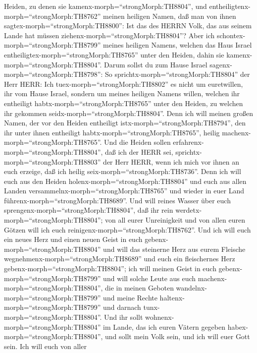 Heiden, zu denen sie kamenx-morph=``strongMorph:TH8804'', und
entheiligtenx-morph=``strongMorph:TH8762'' meinen heiligen Namen, daß
man von ihnen sagtex-morph=``strongMorph:TH8800'': Ist das des HERRN
Volk, das aus seinem Lande hat müssen
ziehenx-morph=``strongMorph:TH8804''?  Aber ich
schontex-morph=``strongMorph:TH8799'' meines heiligen Namens, welchen
das Haus Israel entheiligtex-morph=``strongMorph:TH8765'' unter den
Heiden, dahin sie kamenx-morph=``strongMorph:TH8804''. 
Darum sollst du zum Hause Israel sagenx-morph=``strongMorph:TH8798'': So
sprichtx-morph=``strongMorph:TH8804'' der Herr HERR: Ich
tuex-morph=``strongMorph:TH8802'' es nicht um euretwillen, ihr vom Hause
Israel, sondern um meines heiligen Namens willen, welchen ihr entheiligt
habtx-morph=``strongMorph:TH8765'' unter den Heiden, zu welchen ihr
gekommen seidx-morph=``strongMorph:TH8804''.  Denn ich will
meinen großen Namen, der vor den Heiden entheiligt
istx-morph=``strongMorph:TH8794'', den ihr unter ihnen entheiligt
habtx-morph=``strongMorph:TH8765'', heilig
machenx-morph=``strongMorph:TH8765''. Und die Heiden sollen
erfahrenx-morph=``strongMorph:TH8804'', daß ich der HERR sei,
sprichtx-morph=``strongMorph:TH8803'' der Herr HERR, wenn ich mich vor
ihnen an euch erzeige, daß ich heilig seix-morph=``strongMorph:TH8736''.
 Denn ich will euch aus den Heiden
holenx-morph=``strongMorph:TH8804'' und euch aus allen Landen
versammelnx-morph=``strongMorph:TH8765'' und wieder in euer Land
führenx-morph=``strongMorph:TH8689''.  Und will reines
Wasser über euch sprengenx-morph=``strongMorph:TH8804'', daß ihr rein
werdetx-morph=``strongMorph:TH8804''; von all eurer Unreinigkeit und von
allen euren Götzen will ich euch reinigenx-morph=``strongMorph:TH8762''.
 Und ich will euch ein neues Herz und einen neuen Geist in
euch gebenx-morph=``strongMorph:TH8804'' und will das steinerne Herz aus
eurem Fleische wegnehmenx-morph=``strongMorph:TH8689'' und euch ein
fleischernes Herz gebenx-morph=``strongMorph:TH8804'';  ich
will meinen Geist in euch gebenx-morph=``strongMorph:TH8799'' und will
solche Leute aus euch machenx-morph=``strongMorph:TH8804'', die in
meinen Geboten wandelnx-morph=``strongMorph:TH8799'' und meine Rechte
haltenx-morph=``strongMorph:TH8799'' und darnach
tunx-morph=``strongMorph:TH8804''.  Und ihr sollt
wohnenx-morph=``strongMorph:TH8804'' im Lande, das ich euren Vätern
gegeben habex-morph=``strongMorph:TH8804'', und sollt mein Volk sein,
und ich will euer Gott sein.  Ich will euch von aller
